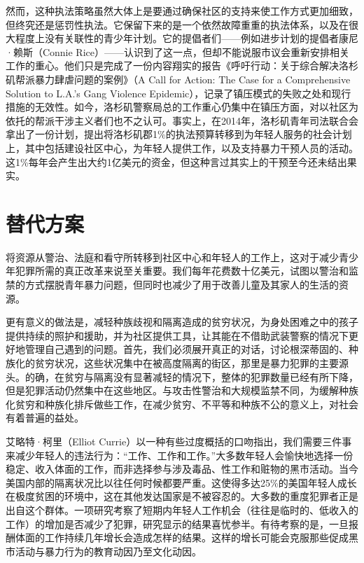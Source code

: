 \documentclass[fontset=fandol, a4paper, 12pt, openright]{ctexbook}
\begin{document}
然而，这种执法策略虽然大体上是要通过确保社区的支持来使工作方式更加细致，但终究还是惩罚性执法。它保留下来的是一个依然故障重重的执法体系，以及在很大程度上没有关联性的青少年计划。它的提倡者们——例如进步计划的提倡者康尼·赖斯（Connie Rice）——认识到了这一点，但却不能说服市议会重新安排相关工作的重心。他们只是完成了一份内容翔实的报告《呼吁行动：关于综合解决洛杉矶帮派暴力肆虐问题的案例》（A Call for Action: The Case for a Comprehensive Solution to L.A.'s Gang Violence Epidemic），记录了镇压模式的失败之处和现行措施的无效性。如今，洛杉矶警察局总的工作重心仍集中在镇压方面，对以社区为依托的帮派干涉主义者们也不之认可。事实上，在2014年，洛杉矶青年司法联合会拿出了一份计划，提出将洛杉矶郡1\%的执法预算转移到为年轻人服务的社会计划上，其中包括建设社区中心，为年轻人提供工作，以及支持暴力干预人员的活动。这1\%每年会产生出大约1亿美元的资金，但这种言过其实上的干预至今还未结出果实。

\section{替代方案}

将资源从警治、法庭和看守所转移到社区中心和年轻人的工作上，这对于减少青少年犯罪所需的真正改革来说至关重要。我们每年花费数十亿美元，试图以警治和监禁的方式摆脱青年暴力问题，但同时也减少了用于改善儿童及其家人的生活的资源。

更有意义的做法是，减轻种族歧视和隔离造成的贫穷状况，为身处困难之中的孩子提供持续的照护和援助，并为社区提供工具，让其能在不借助武装警察的情况下更好地管理自己遇到的问题。首先，我们必须展开真正的对话，讨论根深蒂固的、种族化的贫穷状况，这些状况集中在被高度隔离的街区，那里是暴力犯罪的主要源头。的确，在贫穷与隔离没有显著减轻的情况下，整体的犯罪数量已经有所下降，但是犯罪活动仍然集中在这些地区。与攻击性警治和大规模监禁不同，为缓解种族化贫穷和种族化排斥做些工作，在减少贫穷、不平等和种族不公的意义上，对社会有着普遍的益处。

艾略特·柯里（Elliot Currie）以一种有些过度概括的口吻指出，我们需要三件事来减少年轻人的违法行为：“工作、工作和工作。”大多数年轻人会愉快地选择一份稳定、收入体面的工作，而非选择参与涉及毒品、性工作和赃物的黑市活动。当今美国内部的隔离状况比以往任何时候都要严重。这使得多达25\%的美国年轻人成长在极度贫困的环境中，这在其他发达国家是不被容忍的。大多数的重度犯罪者正是出自这个群体。一项研究考察了短期内年轻人工作机会（往往是临时的、低收入的工作）的增加是否减少了犯罪，研究显示的结果喜忧参半。有待考察的是，一旦报酬体面的工作持续几年增长会造成怎样的结果。这样的增长可能会克服那些促成黑市活动与暴力行为的教育动因乃至文化动因。
\end{document}
